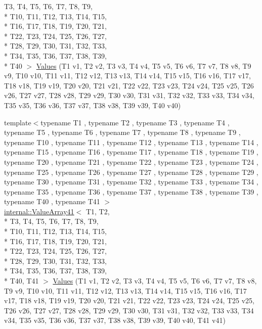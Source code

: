 \begin{DoxyCompactItemize}
T3, T4, T5, T6, T7, T8, T9, \\*
T10, T11, T12, T13, T14, T15, \\*
T16, T17, T18, T19, T20, T21, \\*
T22, T23, T24, T25, T26, T27, \\*
T28, T29, T30, T31, T32, T33, \\*
T34, T35, T36, T37, T38, T39, \\*
T40 $>$ \hyperlink{namespacetesting_adaa8b96d44c103a70e5c4a4b3430ef4d}{Values} (T1 v1, T2 v2, T3 v3, T4 v4, T5 v5, T6 v6, T7 v7, T8 v8, T9 v9, T10 v10, T11 v11, T12 v12, T13 v13, T14 v14, T15 v15, T16 v16, T17 v17, T18 v18, T19 v19, T20 v20, T21 v21, T22 v22, T23 v23, T24 v24, T25 v25, T26 v26, T27 v27, T28 v28, T29 v29, T30 v30, T31 v31, T32 v32, T33 v33, T34 v34, T35 v35, T36 v36, T37 v37, T38 v38, T39 v39, T40 v40)
\item 
{\footnotesize template$<$typename T1 , typename T2 , typename T3 , typename T4 , typename T5 , typename T6 , typename T7 , typename T8 , typename T9 , typename T10 , typename T11 , typename T12 , typename T13 , typename T14 , typename T15 , typename T16 , typename T17 , typename T18 , typename T19 , typename T20 , typename T21 , typename T22 , typename T23 , typename T24 , typename T25 , typename T26 , typename T27 , typename T28 , typename T29 , typename T30 , typename T31 , typename T32 , typename T33 , typename T34 , typename T35 , typename T36 , typename T37 , typename T38 , typename T39 , typename T40 , typename T41 $>$ }\\\hyperlink{classtesting_1_1internal_1_1_value_array41}{internal\-::\-Value\-Array41}$<$ T1, T2, \\*
T3, T4, T5, T6, T7, T8, T9, \\*
T10, T11, T12, T13, T14, T15, \\*
T16, T17, T18, T19, T20, T21, \\*
T22, T23, T24, T25, T26, T27, \\*
T28, T29, T30, T31, T32, T33, \\*
T34, T35, T36, T37, T38, T39, \\*
T40, T41 $>$ \hyperlink{namespacetesting_a51df725741cfcc9539c48885fc2728b0}{Values} (T1 v1, T2 v2, T3 v3, T4 v4, T5 v5, T6 v6, T7 v7, T8 v8, T9 v9, T10 v10, T11 v11, T12 v12, T13 v13, T14 v14, T15 v15, T16 v16, T17 v17, T18 v18, T19 v19, T20 v20, T21 v21, T22 v22, T23 v23, T24 v24, T25 v25, T26 v26, T27 v27, T28 v28, T29 v29, T30 v30, T31 v31, T32 v32, T33 v33, T34 v34, T35 v35, T36 v36, T37 v37, T38 v38, T39 v39, T40 v40, T41 v41)

\end{DoxyCompactItemize}

